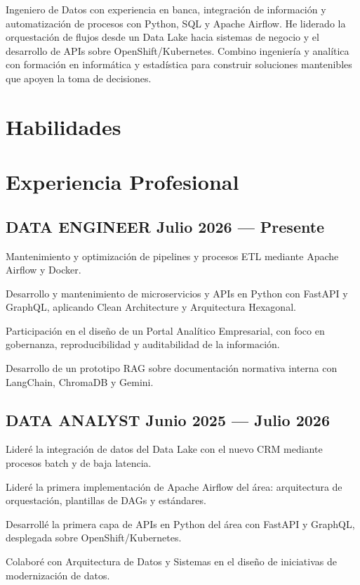\documentclass[letter,10pt]{article}
\begin{document}
Ingeniero de Datos con experiencia en banca, integración de información y automatización de procesos con Python, SQL y Apache Air{f}low. He liderado la orquestación de flujos desde un Data Lake hacia sistemas de negocio y el desarrollo de APIs sobre OpenShift/Kubernetes. Combino ingeniería y analítica con formación en informática y estadística para construir soluciones mantenibles que apoyen la toma de decisiones.
\vspace{0.3em}

\section{Habilidades}


\section{Experiencia Profesional}
\subsection{{DATA ENGINEER \hfill Julio 2026 --- Presente}}
\begin{zitemize}
\item Mantenimiento y optimización de pipelines y procesos ETL mediante Apache Air{f}low y Docker.
\item Desarrollo y mantenimiento de microservicios y APIs en Python con FastAPI y GraphQL, aplicando Clean Architecture y Arquitectura Hexagonal.
\item Participación en el diseño de un Portal Analítico Empresarial, con foco en gobernanza, reproducibilidad y auditabilidad de la información.
\item Desarrollo de un prototipo RAG sobre documentación normativa interna con LangChain, ChromaDB y Gemini.
\end{zitemize}

\subsection{{DATA ANALYST \hfill Junio 2025 --- Julio 2026}}
\begin{zitemize}
\item Lideré la integración de datos del Data Lake con el nuevo CRM mediante procesos batch y de baja latencia.
\item Lideré la primera implementación de Apache Air{f}low del área: arquitectura de orquestación, plantillas de DAGs y estándares.
\item Desarrollé la primera capa de APIs en Python del área con FastAPI y GraphQL, desplegada sobre OpenShift/Kubernetes.
\item Colaboré con Arquitectura de Datos y Sistemas en el diseño de iniciativas de modernización de datos.
\end{zitemize}
\end{document}
